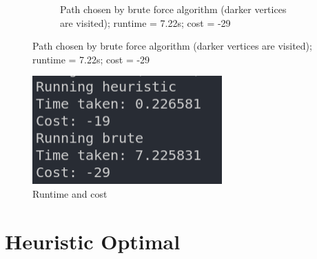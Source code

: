 \documentclass[12pt]{report}
\begin{document}
\begin{figure}[h]
\begin{subfigure}{0.5\textwidth}
    \caption{Path chosen by brute force algorithm (darker vertices are visited); runtime = 7.22s; cost = -29}
    \end{subfigure}
\end{figure}
\begin{figure}
    \centering
    \includegraphics[width=0.4\linewidth]{assets/latex/differentPath/stats.png}
    \caption{Runtime and cost}
\end{figure}

\section{Heuristic Optimal}
\end{document}
